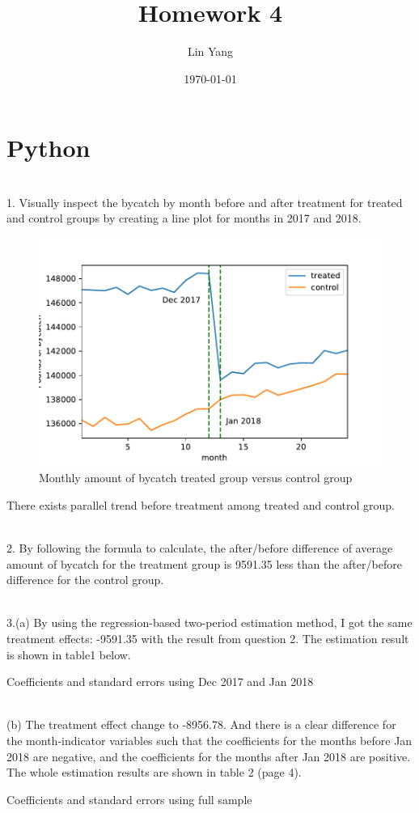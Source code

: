 \documentclass{article}
\title{Homework 4}
\author{Lin Yang}
\date{\today}
\begin{document}
\maketitle  
\section{Python}
~\\
1. Visually inspect the bycatch by month before and after treatment for treated and control groups by creating a line plot for months in 2017 and 2018. 
\begin{figure}[ht]
\centering
	\includegraphics[scale = 0.9]{hw4a.pdf}
    \caption{Monthly amount of bycatch treated group versus control group}
\end{figure}

There exists parallel trend before treatment among treated and control group. 

~\\
2. By following the formula to calculate, the after/before difference of average amount of bycatch for the treatment group is 9591.35 less than the after/before difference for the control group. 

~\\
3.(a) By using the regression-based two-period estimation method, I got the same treatment effects: -9591.35 with the result from question 2. The estimation result is shown in table1 below.
\begin{table}[H]
	\centering
		
	\caption{Coefficients and standard errors using Dec 2017 and Jan 2018}
\end{table}

~\\(b) The treatment effect change to -8956.78. And there is a clear difference for the month-indicator variables such that the coefficients for the months before Jan 2018 are negative, and the coefficients for the months after Jan 2018 are positive. The whole estimation results are shown in table 2 (page 4). 
\begin{table}[ht]
	\centering
		
	\caption{Coefficients and standard errors using full sample}
\end{table}
\end{document}
